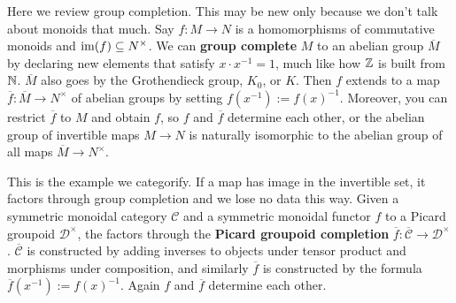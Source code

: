 \orbreak
Here we review group completion. This may be new only because we don't talk about monoids that much. Say $f \colon M \to N$ is a homomorphisms of commutative monoids and $\operatorname{im} (f) \subseteq N ^{\times }$. We can \textbf{group complete} $M$ to an abelian group $\overline{M}$ by declaring new elements that satisfy $x \cdot x^{-1}=1$, much like how $\mathbb{Z}$ is built from $\mathbb{N}$. $\overline{M}$ also goes by the Grothendieck group, $K_0$, or $K$. Then $f$ extends to a map $\overline{f}\colon \overline{M} \to N^{\times }$ of abelian groups by setting $f( x ^{-1}):=f(x) ^{-1}$. Moreover, you can restrict $\overline{f}$ to $M$ and obtain $f$, so $f$ and $\overline{f}$ determine each other, or the abelian group of invertible maps $M \to N$ is naturally isomorphic to the abelian group of all maps $\overline{M}\to  N^{\times }$.

This is the example we categorify. If a map has image in the invertible set, it factors through group completion and we lose no data this way. Given a symmetric monoidal category $\mathcal{C} $ and a symmetric monoidal functor $f$ to a Picard groupoid $\mathcal{D} ^{\times }$, the factors through the \textbf{Picard groupoid completion} $\overline{f}\colon \overline{\mathcal{C} } \to \mathcal{D} ^{\times }$. $\overline{\mathcal{C} }$ is constructed by adding inverses to objects under tensor product and morphisms under composition, and similarly $\overline{f}$ is constructed by the formula $\overline{f}(x ^{-1}):= f(x)^{-1}$. Again $f$ and $\overline{f}$ determine each other. 

